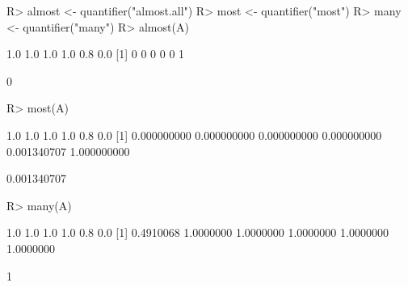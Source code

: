 \begin{Schunk}
% --begin: "quant5"
\begin{Sinput}
R> almost <- quantifier("almost.all")
R> most <- quantifier("most")
R> many <- quantifier("many")
R> almost(A)
\end{Sinput}
\begin{Soutput}
[1] 1.0 1.0 1.0 1.0 0.8 0.0
[1] 0 0 0 0 0 1
\end{Soutput}
\begin{Soutput}
[1] 0
\end{Soutput}
\begin{Sinput}
R> most(A)
\end{Sinput}
\begin{Soutput}
[1] 1.0 1.0 1.0 1.0 0.8 0.0
[1] 0.000000000 0.000000000 0.000000000 0.000000000 0.001340707 1.000000000
\end{Soutput}
\begin{Soutput}
[1] 0.001340707
\end{Soutput}
\begin{Sinput}
R> many(A)
\end{Sinput}
\begin{Soutput}
[1] 1.0 1.0 1.0 1.0 0.8 0.0
[1] 0.4910068 1.0000000 1.0000000 1.0000000 1.0000000 1.0000000
\end{Soutput}
\begin{Soutput}
[1] 1
\end{Soutput}
%
% --end: "quant5"
\end{Schunk}
